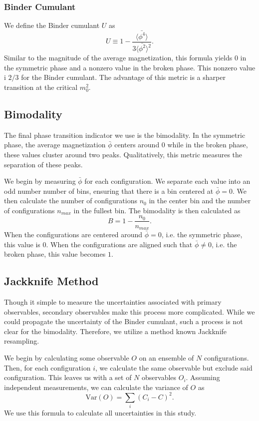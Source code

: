 \documentclass[12pt]{report}
\begin{document}
\subsubsection{Binder Cumulant}
We define the Binder cumulant $U$ as \cite{landau2000}
\begin{equation}
    U \equiv 1-\frac{\langle \bar{\phi^4} \rangle}{3\langle \bar{\phi^2}\rangle^2}.
\end{equation}
Similar to the magnitude of the average magnetization, this formula yields $0$ in the symmetric phase and a nonzero value in the broken phase. This nonzero value i $2/3$ for the Binder cumulant. The advantage of this metric is a sharper transition at the critical $m_0^2$.

\subsection{Bimodality}
The final phase transition indicator we use is the bimodality. In the symmetric phase, the average magnetization $\bar\phi$ centers around $0$ while in the broken phase, these values cluster around two peaks. Qualitatively, this metric measures the separation of these peaks.

We begin by measuring $\bar\phi$ for each configuration. We separate each value into an odd number number of bins, ensuring that there is a bin centered at $\bar\phi=0$. We then calculate the number of configurations $n_0$ in the center bin and the number of configurations $n_{max}$ in the fullest bin. The bimodality is then calculated as
\begin{equation}
    B = 1 - \frac{n_0}{n_{max}}.
\end{equation}
When the configurations are centered around $\bar\phi=0$, i.e. the symmetric phase, this value is $0$. When the configurations are aligned such that $\bar\phi\neq0$, i.e. the broken phase, this value becomes $1$.
\subsection{Jackknife Method}
Though it simple to measure the uncertainties associated with primary observables, secondary observables make this process more complicated. While we could propagate the uncertainty of the Binder cumulant, such a process is not clear for the bimodality. Therefore, we utilize a method known Jackknife resampling. 

We begin by calculating some observable $O$ on an ensemble of $N$ configurations. Then, for each configuration $i$, we calculate the same observable but exclude said configuration. This leaves us with a set of $N$ observables $O_i$. Assuming independent measurements, we can calculate the variance of $O$ as
\begin{equation}
    \mathrm{Var}(O) = \sum_{i} \left(C_i - C\right)^2.
\end{equation}
We use this formula to calculate all uncertainties in this study.
\end{document}
